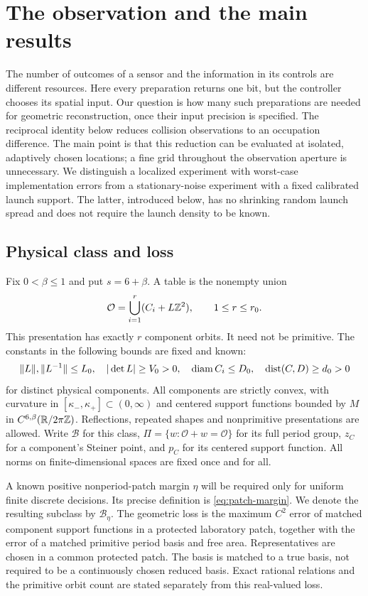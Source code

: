 \section{The observation and the main results}
\label{sec:setting}
The number of outcomes of a sensor and the information in its controls
are different resources. Here every preparation returns one bit, but
the controller chooses its spatial input. Our question is how many such
preparations are needed for geometric reconstruction, once their input
precision is specified. The reciprocal identity below reduces collision
observations to an occupation difference. The main point is that this
reduction can be evaluated at isolated, adaptively chosen locations;
a fine grid throughout the observation aperture is unnecessary.
We distinguish a localized experiment with worst-case implementation
errors from a stationary-noise experiment with a fixed calibrated launch
support. The latter, introduced below, has no shrinking random launch
spread and does not require the launch density to be known.

\subsection{Physical class and loss}
Fix $0<\beta\le1$ and put $s=6+\beta$. A table is the nonempty union
\begin{equation}\label{eq:presentation}
 \mathcal O=\bigcup_{i=1}^r(C_i+L\mathbb Z^2),\qquad 1\le r\le r_0.
\end{equation}
This presentation has exactly $r$ component orbits. It need not be
primitive. The constants in the following bounds are fixed and known:
\begin{equation}\label{eq:priors}
 \|L\|,\|L^{-1}\|\le L_0,\quad |\det L|\ge V_0>0,\quad
 \operatorname{diam} C_i\le D_0,\quad \operatorname{dist}(C,D)\ge d_0>0
\end{equation}
for distinct physical components. All components are strictly convex,
with curvature in $[\kappa_-,\kappa_+]\subset(0,\infty)$ and centered
support functions bounded by $M$ in $C^{6,\beta}(\mathbb R/2\pi\mathbb Z)$.
Reflections, repeated shapes and nonprimitive presentations are allowed.
Write $\mathcal B$ for this class, $\Pi=\{w:\mathcal O+w=\mathcal O\}$
for its full period group, $z_C$ for a component's Steiner point, and
$p_C$ for its centered support function. All norms on finite-dimensional
spaces are fixed once and for all.

A known positive nonperiod-patch margin $\eta$ will be required only
for uniform finite discrete decisions. Its precise definition is
\eqref{eq:patch-margin}. We denote the resulting subclass by
$\mathcal B_\eta$. The geometric loss is the maximum $C^2$ error of
matched component support functions in a protected laboratory patch,
together with the error of a matched primitive period basis and free
area. Representatives are chosen in a common protected patch. The
basis is matched to a true basis, not required to be a continuously
chosen reduced basis. Exact rational relations and the primitive orbit
count are stated separately from this real-valued loss.

